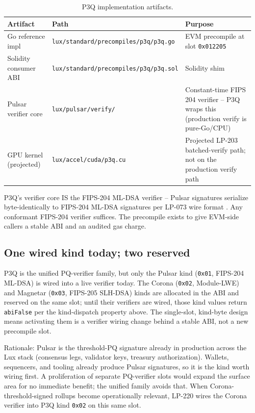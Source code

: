 \begin{table}[h]
\centering
\small
\begin{tabular}{@{}lp{6cm}p{4cm}@{}}
\toprule
\textbf{Artifact} & \textbf{Path} & \textbf{Purpose} \\
\midrule
Go reference impl & \texttt{lux/standard/precompiles/p3q/p3q.go} & EVM precompile at slot \texttt{0x012205} \\
Solidity consumer ABI & \texttt{lux/standard/precompiles/p3q/p3q.sol} & Solidity shim \\
Pulsar verifier core & \texttt{lux/pulsar/verify/} & Constant-time FIPS 204 verifier -- P3Q wraps this (production verify is pure-Go/CPU) \\
GPU kernel (projected) & \texttt{lux/accel/cuda/p3q.cu} & Projected LP-203 batched-verify path; not on the production verify path \\
\bottomrule
\end{tabular}
\caption{P3Q implementation artifacts.}
\label{tab:p3q-impl}
\end{table}

P3Q's verifier core IS the FIPS-204 ML-DSA verifier -- Pulsar
signatures serialize byte-identically to FIPS-204 ML-DSA
signatures per LP-073 wire format \cite{fips204}. Any conformant
FIPS-204 verifier suffices. The precompile exists to give EVM-side
callers a stable ABI and an audited gas charge.

\subsection{One wired kind today; two reserved}

P3Q is the unified PQ-verifier family, but only the Pulsar kind
(\texttt{0x01}, FIPS-204 ML-DSA) is wired into a live verifier
today. The Corona (\texttt{0x02}, Module-LWE) and Magnetar
(\texttt{0x03}, FIPS-205 SLH-DSA) kinds are allocated in the ABI
and reserved on the same slot; until their verifiers are wired,
those kind values return \texttt{abiFalse} per the kind-dispatch
property above. The single-slot, kind-byte design means activating
them is a verifier wiring change behind a stable ABI, not a new
precompile slot.

Rationale: Pulsar is the threshold-PQ signature already in
production across the Lux stack (consensus legs, validator keys,
treasury authorization). Wallets, sequencers, and tooling already
produce Pulsar signatures, so it is the kind worth wiring first. A
proliferation of separate PQ-verifier slots would expand the
surface area for no immediate benefit; the unified family avoids
that. When Corona-threshold-signed rollups become operationally
relevant, LP-220 wires the Corona verifier into P3Q kind
\texttt{0x02} on this same slot.
